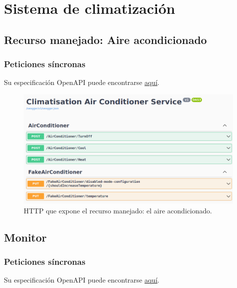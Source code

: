 \section{Sistema de climatización}

\subsection{Recurso manejado: Aire acondicionado}

\subsubsection{Peticiones síncronas}

Su especificación OpenAPI puede encontrarse \href{https://github.com/Starkie/TFM-DistributedAutoadaptiveSystems/blob/1db95346290cb55edbfd5efb717785bcd06def79/src/AutoAdaptativeSystem/Climatisation/AirConditioner/Service/Climatisation.AirConditioner.Service-OpenAPISpec.json}{aquí}.

\begin{figure}[h!]
  \hspace{-0.25cm}
  \includegraphics[scale=0.45]{anx_apis/images/apis-airconditioner}
  \caption{ HTTP que expone el recurso manejado: el aire acondicionado.}
\end{figure}

\subsection{Monitor}

\subsubsection{Peticiones síncronas}

Su especificación OpenAPI puede encontrarse \href{https://github.com/Starkie/TFM-DistributedAutoadaptiveSystems/blob/1db95346290cb55edbfd5efb717785bcd06def79/src/AutoAdaptativeSystem/Climatisation/Monitor/Climatisation.Monitor.Service-OpenAPISpec.json}{aquí}.

